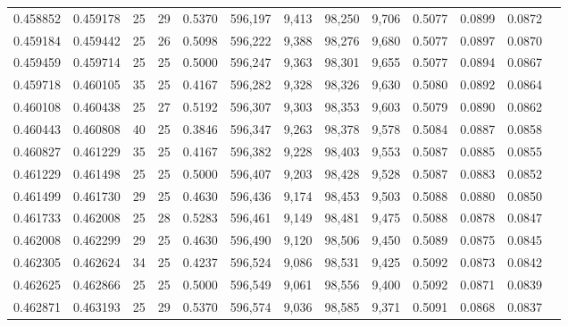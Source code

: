 \begin{tabular}{rrrrrrrrrrrrr}
0.458852 & 0.459178 &    25 &  29 &                                     0.5370 & 596,197 &   9,413 &  98,250 &   9,706 & 0.5077 & 0.0899 & 0.0872 \\
0.459184 & 0.459442 &    25 &  26 &                                     0.5098 & 596,222 &   9,388 &  98,276 &   9,680 & 0.5077 & 0.0897 & 0.0870 \\
0.459459 & 0.459714 &    25 &  25 &                                     0.5000 & 596,247 &   9,363 &  98,301 &   9,655 & 0.5077 & 0.0894 & 0.0867 \\
0.459718 & 0.460105 &    35 &  25 &                                     0.4167 & 596,282 &   9,328 &  98,326 &   9,630 & 0.5080 & 0.0892 & 0.0864 \\
0.460108 & 0.460438 &    25 &  27 &                                     0.5192 & 596,307 &   9,303 &  98,353 &   9,603 & 0.5079 & 0.0890 & 0.0862 \\
0.460443 & 0.460808 &    40 &  25 &                                     0.3846 & 596,347 &   9,263 &  98,378 &   9,578 & 0.5084 & 0.0887 & 0.0858 \\
0.460827 & 0.461229 &    35 &  25 &                                     0.4167 & 596,382 &   9,228 &  98,403 &   9,553 & 0.5087 & 0.0885 & 0.0855 \\
0.461229 & 0.461498 &    25 &  25 &                                     0.5000 & 596,407 &   9,203 &  98,428 &   9,528 & 0.5087 & 0.0883 & 0.0852 \\
0.461499 & 0.461730 &    29 &  25 &                                     0.4630 & 596,436 &   9,174 &  98,453 &   9,503 & 0.5088 & 0.0880 & 0.0850 \\
0.461733 & 0.462008 &    25 &  28 &                                     0.5283 & 596,461 &   9,149 &  98,481 &   9,475 & 0.5088 & 0.0878 & 0.0847 \\
0.462008 & 0.462299 &    29 &  25 &                                     0.4630 & 596,490 &   9,120 &  98,506 &   9,450 & 0.5089 & 0.0875 & 0.0845 \\
0.462305 & 0.462624 &    34 &  25 &                                     0.4237 & 596,524 &   9,086 &  98,531 &   9,425 & 0.5092 & 0.0873 & 0.0842 \\
0.462625 & 0.462866 &    25 &  25 &                                     0.5000 & 596,549 &   9,061 &  98,556 &   9,400 & 0.5092 & 0.0871 & 0.0839 \\
0.462871 & 0.463193 &    25 &  29 &                                     0.5370 & 596,574 &   9,036 &  98,585 &   9,371 & 0.5091 & 0.0868 & 0.0837 \\

\end{tabular}

